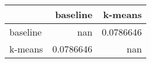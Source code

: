\begin{tabular}{lrr}
\toprule
          &    baseline &     k-means \\
\midrule
 baseline & nan         &   0.0786646 \\
 k-means  &   0.0786646 & nan         \\
\bottomrule
\end{tabular}
